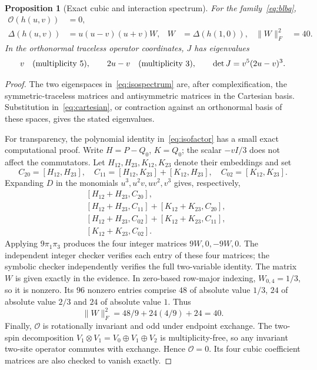 \documentclass[11pt,a4paper]{article}
\numberwithin{equation}{section}
\newtheorem{proposition}[theorem]{Proposition}
\theoremstyle{definition}\newtheorem{definition}[theorem]{Definition}
\theoremstyle{remark}\newtheorem{remark}[theorem]{Remark}
\newcommand{\Ob}{\mathcal O}\newcommand{\tens}{\otimes}
\begin{document}
\begin{proposition}[Exact cubic and interaction spectrum]\label{prop:isocubic}
For the family~\eqref{eq:blbq},
\begin{align}
 \Ob(h(u,v))&=0,\label{eq:isoblind}\\
 \Delta(h(u,v))&=u(u-v)(u+v)W,
 &W&=\Delta(h(1,0)),& \|W\|_F^2&=40.\label{eq:isofactor}
\end{align}
In the orthonormal traceless operator coordinates, $J$ has eigenvalues
\begin{equation}\label{eq:isospectrum}
 v\quad(\hbox{multiplicity }5),\qquad
 2u-v\quad(\hbox{multiplicity }3),\qquad
 \det J=v^5(2u-v)^3.
\end{equation}
\end{proposition}
\begin{proof}
The two eigenspaces in~\eqref{eq:isospectrum} are, after complexification, the symmetric-traceless matrices and antisymmetric matrices in the Cartesian basis. Substitution in~\eqref{eq:cartesian}, or contraction against an orthonormal basis of these spaces, gives the stated eigenvalues.

For transparency, the polynomial identity in~\eqref{eq:isofactor} has a small exact computational proof. Write $H=P-Q_0$, $K=Q_0$; the scalar $-vI/3$ does not affect the commutators. Let $H_{12},H_{23},K_{12},K_{23}$ denote their embeddings and set
\[
 C_{20}=[H_{12},H_{23}],\quad
 C_{11}=[H_{12},K_{23}]+[K_{12},H_{23}],\quad
 C_{02}=[K_{12},K_{23}].
\]
Expanding $D$ in the monomials $u^3,u^2v,uv^2,v^3$ gives, respectively,
\begin{align*}
 &[H_{12}+H_{23},C_{20}],\\
 &[H_{12}+H_{23},C_{11}]+[K_{12}+K_{23},C_{20}],\\
 &[H_{12}+H_{23},C_{02}]+[K_{12}+K_{23},C_{11}],\\
 &[K_{12}+K_{23},C_{02}].
\end{align*}
Applying $9\pi_1\pi_3$ produces the four integer matrices
$9W,0,-9W,0$. The independent integer checker verifies each entry of these four matrices; the symbolic checker independently verifies the full two-variable identity. The matrix $W$ is given exactly in the evidence. In zero-based row-major indexing, $W_{0,4}=1/3$, so it is nonzero. Its $96$ nonzero entries comprise $48$ of absolute value $1/3$, $24$ of absolute value $2/3$ and $24$ of absolute value $1$. Thus
\[
 \|W\|_F^2=48/9+24(4/9)+24=40.
\]
Finally, $\Ob$ is rotationally invariant and odd under endpoint exchange. The two-spin decomposition $V_1\tens V_1=V_0\oplus V_1\oplus V_2$ is multiplicity-free, so any invariant two-site operator commutes with exchange. Hence $\Ob=0$. Its four cubic coefficient matrices are also checked to vanish exactly.
\end{proof}
\end{document}
